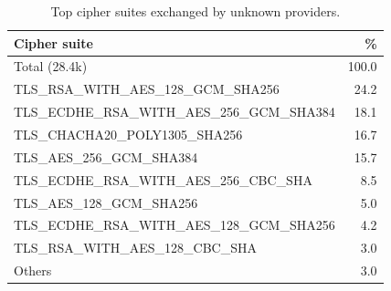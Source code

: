 \begin{table}[tb]
\centering
\small
\caption{Top cipher suites exchanged by unknown providers.}
\begin{tabular}{lr}
\toprule
\textbf{Cipher suite} & \textbf{\%} \\
\midrule
Total (28.4k) & 100.0 \\
\hline
TLS\_RSA\_WITH\_AES\_128\_GCM\_SHA256 & 24.2 \\
TLS\_ECDHE\_RSA\_WITH\_AES\_256\_GCM\_SHA384 & 18.1 \\
TLS\_CHACHA20\_POLY1305\_SHA256 & 16.7 \\
TLS\_AES\_256\_GCM\_SHA384 & 15.7 \\
TLS\_ECDHE\_RSA\_WITH\_AES\_256\_CBC\_SHA & 8.5 \\
TLS\_AES\_128\_GCM\_SHA256 & 5.0 \\
TLS\_ECDHE\_RSA\_WITH\_AES\_128\_GCM\_SHA256 & 4.2 \\
TLS\_RSA\_WITH\_AES\_128\_CBC\_SHA & 3.0 \\
Others & 3.0 \\
\bottomrule
\end{tabular}
\label{tab:unknown-cloud-ciphers}
\end{table}